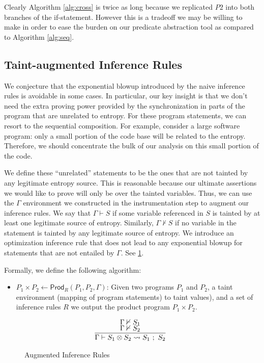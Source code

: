 \documentclass[letterpaper,twocolumn,10pt]{article}
\newcommand{\cross}{\otimes{}}
\begin{document}
Clearly Algorithm \ref{alg:cross} is twice as long because we replicated $P2$ into both branches of the if-statement. However this is a tradeoff we may be willing to make in order to ease the burden on our predicate abstraction tool as compared to Algorithm \ref{alg:seq}.

\subsection{Taint-augmented Inference Rules}
\label{sec:augpprules}

We conjecture that the exponential blowup introduced by the naive inference rules is avoidable in some cases. In particular, our key insight is that we don't need the extra proving power provided by the synchronization in parts of the program that are unrelated to entropy. For these program statements, we can resort to the sequential composition. For example, consider a large software program: only a small portion of the code base will be related to the entropy. Therefore, we should concentrate the bulk of our analysis on this small portion of the code. 

We define these ``unrelated'' statements to be the ones that are not tainted by any legitimate entropy source. This is reasonable because our ultimate assertions we would like to prove will only be over the tainted variables. Thus, we can use the $\Gamma$ environment we constructed in the instrumentation step to augment our inference rules. We say that $\Gamma \vdash S$ if some variable referenced in $S$ is tainted by at least one legitimate source of entropy. Similarly, $\Gamma \nvdash S$ if no variable in the statement is tainted by any legitimate source of entropy. We introduce an optimization inference rule that does not lead to any exponential blowup for statements that are not entailed by $\Gamma$. See \ref{fig:auginfrules1}.

Formally, we define the following algorithm:

\begin{itemize}
    \item $P_1 \times P_2 \gets \mathsf{Prod}_R(P_1, P_2, \Gamma)$: Given two programs $P_1$ and $P_2$, a taint environment (mapping of program statements) to 
    taint values), and a set of inference rules $R$ we output the product program $P_1 \times P_2$.
\end{itemize}

\begin{figure}
    \caption{Augmented Inference Rules}
    \label{fig:auginfrules1}
    \[
		\begin{array}{c}
			\infer[]{\Gamma \vdash S_1 \cross S_2 \leadsto S_1\ ;\ S_2}{
				\Gamma \nvdash S_1 \\
				\Gamma \nvdash S_2
			} \\
		\end{array}
    \]
\end{figure}
\end{document}
